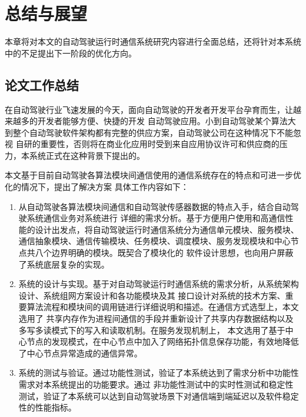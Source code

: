 \chapter{总结与展望}
本章将对本文的自动驾驶运行时通信系统研究内容进行全面总结，还将针对本系统中的不足提出下一阶段的优化方向。
\section{论文工作总结}
在自动驾驶行业飞速发展的今天，面向自动驾驶的开发者开发平台孕育而生，让越来越多的开发者能够方便、快捷的开发
自动驾驶应用。小到自动驾驶某个算法大到整个自动驾驶软件架构都有完整的供应方案，自动驾驶公司在这种情况下不能忽视
自研的重要性，否则将在商业化应用时受到来自应用协议许可和供应商的压力，本系统正式在这种背景下提出的。

本文基于目前自动驾驶各算法模块间通信使用的通信系统存在的特点和可进一步优化的情况下，提出了解决方案
具体工作内容如下：
\begin{enumerate}
    \item 从自动驾驶各算法模块间通信和自动驾驶传感器数据的特点入手，结合自动驾驶系统通信业务对系统进行
    详细的需求分析。基于方便用户使用和高通信性能的设计出发点，将自动驾驶运行时通信系统分为通信单元模块、服务模块、
    通信抽象模块、通信传输模块、任务模块、调度模块、服务发现模块和中心节点共八个边界明确的模块。既契合了模块化的
    软件设计思想，也向用户屏蔽了系统底层复杂的实现。
    \item 系统的设计与实现。基于对自动驾驶运行时通信系统的需求分析，从系统架构设计、系统组网方案设计和各功能模块及其
    接口设计对系统的技术方案、重要算法流程和模块间的调用链进行详细说明和描述。在通信方式选型上，本文选用了
    共享内存作为进程间通信的手段并重新设计了共享内存数据结构以及多写多读模式下的写入和读取机制。在服务发现机制上，
    本文选用了基于中心节点的发现模式，在中心节点中加入了网络拓扑信息保存功能，有效地降低了中心节点异常造成的通信异常。
    \item 系统的测试与验证。通过功能性测试，验证了本系统达到了需求分析中功能性需求对本系统提出的功能要求。通过
    非功能性测试中的实时性测试和稳定性测试，验证了本系统可以达到自动驾驶场景下对通信端到端延迟以及软件稳定性的性能指标。
\end{enumerate}

